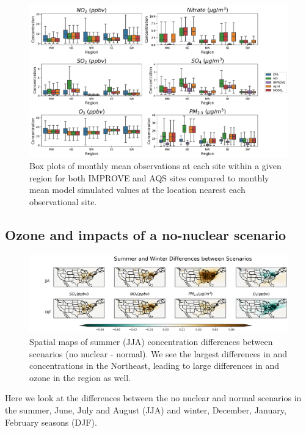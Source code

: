 \documentclass[12]{article}
\begin{document}
\begin{figure}
    \centering
    \includegraphics[scale=0.5]{model_validation/Figures/obs_boxplots.png}
    \caption{Box plots of monthly mean observations at each site within a given region for both IMPROVE and AQS sites compared to monthly mean model simulated values at the location nearest each observational site.} 
    \label{fig:obs_model}
\end{figure}


\subsection{Ozone and  impacts of a no-nuclear scenario}

\begin{figure}
    \centering
    \includegraphics[scale=0.4]{ego_nonuclear_project/Figures/summer_winter_national_dif.png}
    \caption{Spatial maps of summer (JJA) concentration differences between scenarios (no nuclear - normal). We see the largest differences in  and  concentrations in the Northeast, leading to large differences in  and ozone in the region as well.} 
    \label{fig:summer_winter_dif}
\end{figure}


Here we look at the differences between the no nuclear and normal scenarios in the summer, June, July and August (JJA) and winter, December, January, February seasons (DJF). 
\end{document}
